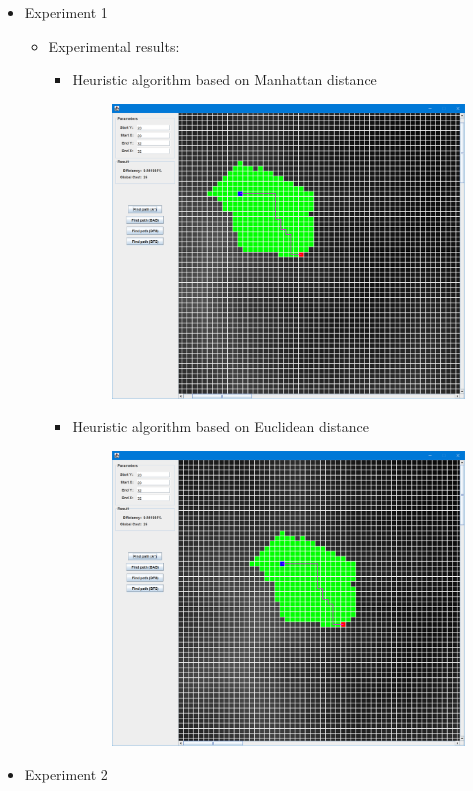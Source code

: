 \documentclass[
]{article}
\begin{document}
\begin{itemize}
\item
  Experiment 1

  \begin{itemize}
  \item
    Experimental results:

    \begin{itemize}
    \item
      Heuristic algorithm based on Manhattan distance

      \begin{figure}
      \centering
      \includegraphics{./images/image-20210523082215544.png}
      \caption{}
      \end{figure}
    \item
      Heuristic algorithm based on Euclidean distance

      \begin{figure}
      \centering
      \includegraphics{./images/image-20210523082848030.png}
      \caption{}
      \end{figure}
    \end{itemize}
  \end{itemize}
\item
  Experiment 2


\end{itemize}
\end{document}
